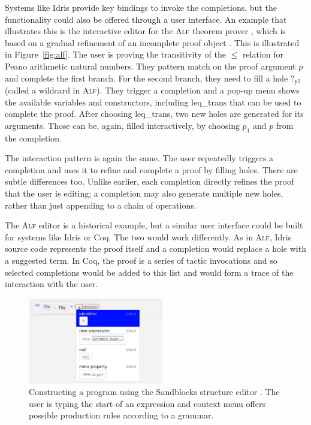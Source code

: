 \documentclass[ a4paper,UKenglish,cleveref, autoref, thm-restate]{lipics-v2021}
\newcommand{\ident}[1]{\textsf{#1}}
\begin{document}
Systems like Idris provide key bindings to invoke the completions, but the functionality could
also be offered through a user interface. An example that illustrates this is the interactive editor
for the \textsc{Alf} theorem prover \cite{magnusson-1994-alf}, which is based on a gradual refinement of
an incomplete proof object \cite{altenkirch-1994-alf}. This is illustrated in Figure~\ref{fig:alf}.
The user is proving the transitivity of the $\leq$ relation for Peano arithmetic natural numbers.
They pattern match on the proof argument $p$ and complete the first branch. For the second branch,
they need to fill a hole $?_{p2}$ (called a wildcard in \textsc{Alf}). They trigger a completion
and a pop-up menu shows the available variables and constructors, including \ident{leq\_trans} that
can be used to complete the proof. After choosing \ident{leq\_trans}, two new holes are generated
for its arguments. Those can be, again, filled interactively, by choosing $p_1$ and $p$ from the
completion.

The interaction pattern is again the same. The user repeatedly triggers a completion and uses
it to refine and complete a proof by filling holes. There are subtle differences too. Unlike
earlier, each completion directly refines the proof that the user is editing;
a completion may also generate multiple new holes, rather than just appending to a
chain of operations.

The \textsc{Alf} editor is a historical example, but a similar user interface could be built for
systems like Idris or Coq. The two would work differently. As in \textsc{Alf}, Idris source code
represents the proof itself and a completion would replace a hole with a suggested term. In Coq,
the proof is a series of tactic invocations and so selected completions would be added to this
list and would form a trace of the interaction with the user.

\begin{figure}[t]
  \vspace{-0.25em}
  \includegraphics[width=0.525\textwidth]{fig/sandblocks.png}
  \caption{Constructing a program using the Sandblocks structure editor \cite{beckmann-2023-all}.
    The user is typing the start of an expression and context menu offers possible production
    rules according to a grammar.}
  \label{fig:sand}
\end{figure}
\end{document}
